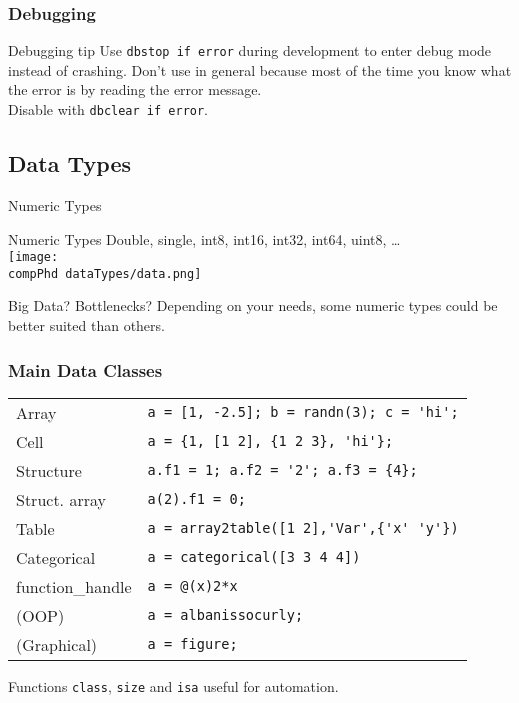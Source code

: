 \documentclass[]{beamer} %
\def\pathbase{/Users/pmxal9/} 	%
\def\pathbase{/Users/pmaal/} 	%
\edef\drop{\pathbase Dropbox/}		%
\edef\compPhd{\drop Nottingham/repos/phd/Seminars/+MatlabComputationalPhD/}
\begin{document}
\begin{frame}[fragile]
\frametitle{Debugging}
\begin{block}{Debugging tip}
Use \verb+dbstop if error+ during development to enter debug mode instead of crashing. 
Don't use in general because most of the time you know what the error is by reading the error message. \\[3mm]
Disable with \verb+dbclear if error+.
\end{block}
\end{frame}


\subsection{Data Types}
\begin{frame}{Numeric Types  }\centering
\begin{block}{Numeric Types}
Double, single, int8, int16, int32, int64,  uint8, \dots\\[2mm]
\texttt{[image: \\compPhd dataTypes/data.png]}
\end{block}
Big Data? Bottlenecks? Depending on your needs, some numeric types could  be better suited than others.
\end{frame}


\begin{frame}[fragile]
\frametitle{Main Data Classes}
\begin{tabular}{l|l}
Array & \verb+a = [1, -2.5]; b = randn(3); c = 'hi';+\\
Cell & \verb+a = {1, [1 2], {1 2 3}, 'hi'};+\\
Structure & \verb+a.f1 = 1; a.f2 = '2'; a.f3 = {4};+\\
Struct. array & \verb+a(2).f1 = 0;+\\
Table  &  \verb+a = array2table([1 2],'Var',{'x' 'y'})+\\
Categorical & \verb+a = categorical([3 3 4 4])+\\ 
function\_handle & \verb+a = @(x)2*x+ \\ 
(OOP) & \verb+a = albanissocurly;+ \\
(Graphical) & \verb+a = figure;+\\[3mm]
 \end{tabular}
Functions \verb+class+, \verb+size+ and \verb+isa+ useful for automation.
\end{frame}
\end{document}
